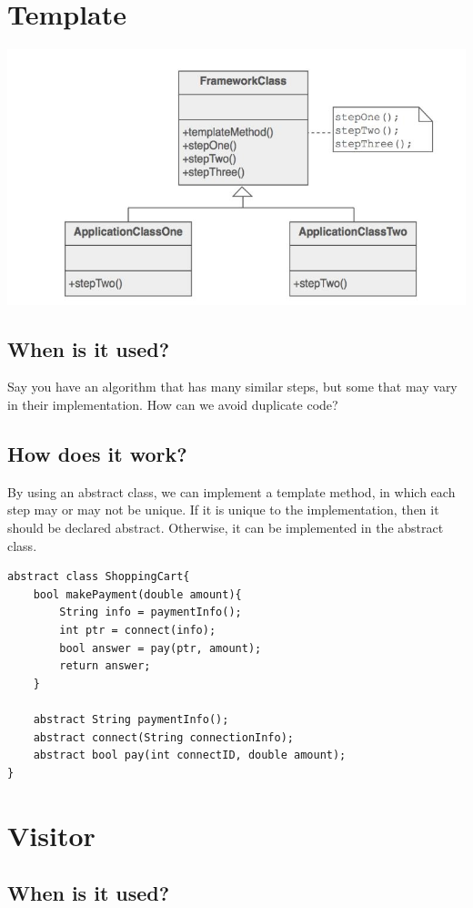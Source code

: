 \documentclass[12pt]{article}
\theoremstyle{definition}
\begin{document}
\section{Template}
\includegraphics{template}
\subsection{When is it used?}
Say you have an algorithm that has many similar steps, but some that may vary in their implementation. How can we avoid duplicate code? 
\\ \linebreak

\subsection{How does it work?}
By using an abstract class, we can implement a template method, in which each step may or may not be unique. If it is unique to the implementation, then it should be declared abstract. Otherwise, it can be implemented in the abstract class.
\\ \linebreak
\begin{lstlisting}
abstract class ShoppingCart{
	bool makePayment(double amount){
		String info = paymentInfo();
		int ptr = connect(info);
		bool answer = pay(ptr, amount);
		return answer;
	}
	
	abstract String paymentInfo();
	abstract connect(String connectionInfo);
	abstract bool pay(int connectID, double amount);
}
\end{lstlisting}

\section{Visitor}
\subsection{When is it used?}
\end{document}
